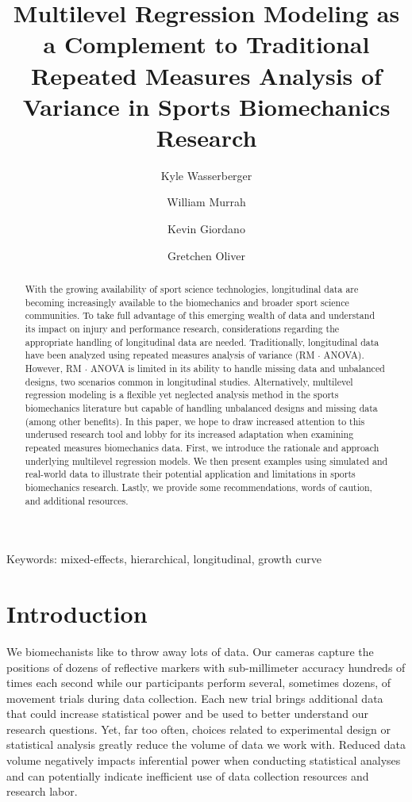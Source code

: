\documentclass[
]{article}
\author[1,2]{\footnotesize Kyle Wasserberger}
\author[3]{\footnotesize William Murrah}
\author[4]{\footnotesize Kevin Giordano}
\author[2]{\footnotesize Gretchen Oliver}
\affil[1]{Research \& Development; Driveline Baseball}
\affil[2]{School of Kinesiology; Auburn University}
\affil[3]{\footnotesize Department of Educational Foundations, Leadership, \& Technology; Auburn University}
\affil[4]{\footnotesize Department of Physical Therapy; Creighton University}
\title{Multilevel Regression Modeling as a Complement to Traditional Repeated Measures Analysis of Variance in Sports Biomechanics Research}
\date{\vspace{-2.5em}}
\begin{document}
\maketitle

\begin{center}
Keywords: mixed-effects, hierarchical, longitudinal, growth curve
\end{center}

\newpage
\linenumbers
\begin{abstract}
\doublespacing
With the growing availability of sport science technologies, longitudinal data are becoming increasingly available to the biomechanics and broader sport science communities. To take full advantage of this emerging wealth of data and understand  its impact on injury and performance research, considerations regarding the appropriate handling of longitudinal data are needed. Traditionally, longitudinal data have been analyzed using repeated measures analysis of variance (RM $\cdot$ ANOVA). However, RM $\cdot$ ANOVA is limited in its ability to handle missing data and unbalanced designs, two scenarios common in longitudinal studies. Alternatively, multilevel regression modeling is a flexible yet neglected analysis method in the sports biomechanics literature but capable of handling unbalanced designs and missing data (among other benefits). In this paper, we hope to draw increased attention to this underused research tool and lobby for its increased adaptation when examining repeated measures biomechanics data. First, we introduce the rationale and approach underlying multilevel regression models. We then present examples using simulated and real-world data to illustrate their potential application and limitations in sports biomechanics research. Lastly, we provide some recommendations, words of caution, and additional resources.
\end{abstract}

\newpage
{}

\hypertarget{introduction}{%
\section{Introduction}\label{introduction}}

\doublespacing

We biomechanists like to throw away lots of data. Our cameras capture the positions of dozens of reflective markers with sub-millimeter accuracy hundreds of times each second while our participants perform several, sometimes dozens, of movement trials during data collection. Each new trial brings additional data that could increase statistical power and be used to better understand our research questions. Yet, far too often, choices related to experimental design or statistical analysis greatly reduce the volume of data we work with. Reduced data volume negatively impacts inferential power when conducting statistical analyses and can potentially indicate inefficient use of data collection resources and research labor.
\end{document}
